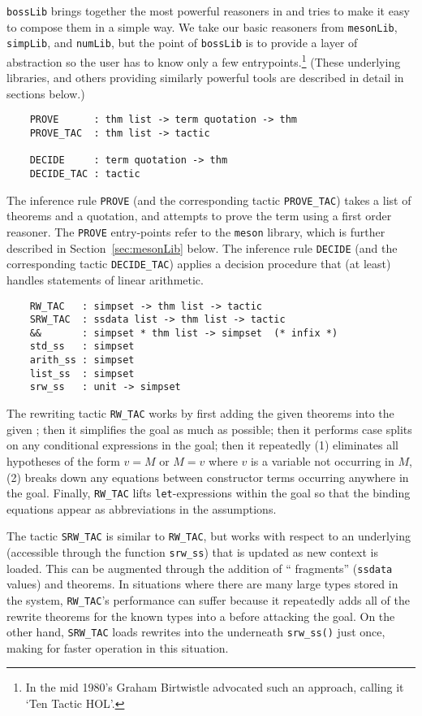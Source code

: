 \verb+bossLib+ brings together the most powerful reasoners in \HOL{} and
tries to make it easy to compose them in a simple way. We take our basic
reasoners from \verb+mesonLib+, \verb+simpLib+, and \verb+numLib+,
but the point of \verb+bossLib+ is to provide a layer of abstraction so
the user has to know only a few entrypoints.\footnote{In the mid 1980's
Graham Birtwistle advocated such an approach, calling it `Ten Tactic
HOL'.} (These underlying libraries, and others providing similarly
powerful tools are described in detail in sections below.)

\begin{verbatim}
    PROVE      : thm list -> term quotation -> thm
    PROVE_TAC  : thm list -> tactic

    DECIDE     : term quotation -> thm
    DECIDE_TAC : tactic
\end{verbatim}

The inference rule \texttt{PROVE} (and the corresponding tactic
\texttt{PROVE\_TAC}) takes a list of theorems and a quotation, and
attempts to prove the term using a first order reasoner.  The
\texttt{PROVE} entry-points refer to the \texttt{meson} library, which
is further described in Section~\ref{sec:mesonLib} below. The
inference rule \texttt{DECIDE} (and the corresponding tactic
\texttt{DECIDE\_TAC}) applies a decision procedure that (at least)
handles statements of linear arithmetic.

\begin{verbatim}
    RW_TAC   : simpset -> thm list -> tactic
    SRW_TAC  : ssdata list -> thm list -> tactic
    &&       : simpset * thm list -> simpset  (* infix *)
    std_ss   : simpset
    arith_ss : simpset
    list_ss  : simpset
    srw_ss   : unit -> simpset
\end{verbatim}

The rewriting tactic \texttt{RW\_TAC} works by first adding the given
theorems into the given \simpset; then it simplifies the goal as much
as possible; then it performs case splits on any conditional
expressions in the goal; then it repeatedly (1) eliminates all
hypotheses of the form $v = M$ or $M = v$ where $v$ is a variable not
occurring in $M$, (2) breaks down any equations between constructor
terms occurring anywhere in the goal. Finally, \texttt{RW\_TAC} lifts
\texttt{let}-expressions within the goal so that the binding equations
appear as abbreviations in the
assumptions.

The tactic \texttt{SRW\_TAC} is similar to \texttt{RW\_TAC}, but works
with respect to an underlying \simpset{} (accessible through the
function \texttt{srw\_ss}) that is updated as new context is loaded.
This \simpset{} can be augmented through the addition of ``\simpset{}
fragments'' (\texttt{ssdata} values) and theorems.  In situations
where there are many large types stored in the system,
\texttt{RW\_TAC}'s performance can suffer because it repeatedly adds
all of the rewrite theorems for the known types into a \simpset{}
before attacking the goal.  On the other hand, \texttt{SRW\_TAC} loads
rewrites into the \simpset{} underneath \texttt{srw\_ss()} just once,
making for faster operation in this situation.

